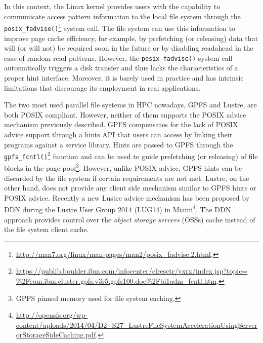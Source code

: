In this context, the Linux kernel provides users with the capability to communicate access pattern information to the local file system through the \texttt{posix\_fadvise()}\footnote{\url{http://man7.org/linux/man-pages/man2/posix\_fadvise.2.html}.} 
system call. The file system can use this information to improve page cache efficiency, for example, by prefetching (or releasing) data that will (or will not) be required soon in the future or by disabling readahead in the case of 
random read patterns. However, the \texttt{posix\_fadvise()} system call automatically triggers a disk transfer and thus lacks the characteristics of a proper hint interface. Moreover, it is barely used in practice and has intrinsic 
limitations that discourage its employment in real applications.

The two most used parallel file systems in HPC nowadays, GPFS and Lustre, are both POSIX compliant. However, neither of them supports the POSIX advice mechanism previously described. GPFS compensates for the lack of POSIX advice 
support through a hints API that users can access by linking their programs against a service library. Hints are passed to GPFS through the \texttt{gpfs\_fcntl()}\footnote{\url{https://publib.boulder.ibm.com/infocenter/clresctr/vxrx/index.jsp?topic=
\%2Fcom.ibm.cluster.gpfs.v3r5.gpfs100.doc\%2Fbl1adm\_fcntl.htm}.} function and can be used to guide prefetching (or releasing) of file blocks in the page pool\footnote{GPFS pinned memory used for file system caching.}. However, 
unlike POSIX advice, GPFS hints can be discarded by the file system if certain requirements are not met. Lustre, on the other hand, does not provide any client side mechanism similar to GPFS hints or POSIX advice. Recently a new 
Lustre advice mechanism has been proposed by DDN during the Lustre User Group 2014 (LUG14) in Miami\footnote{\url{http://opensfs.org/wp-content/uploads/2014/04/D2\_S27\_LustreFileSystemAccelerationUsingServerorStorageSideCaching.pdf}.}. 
The DDN approach provides control over the \textit{object storage servers} (OSSs) cache instead of the file system client cache.

